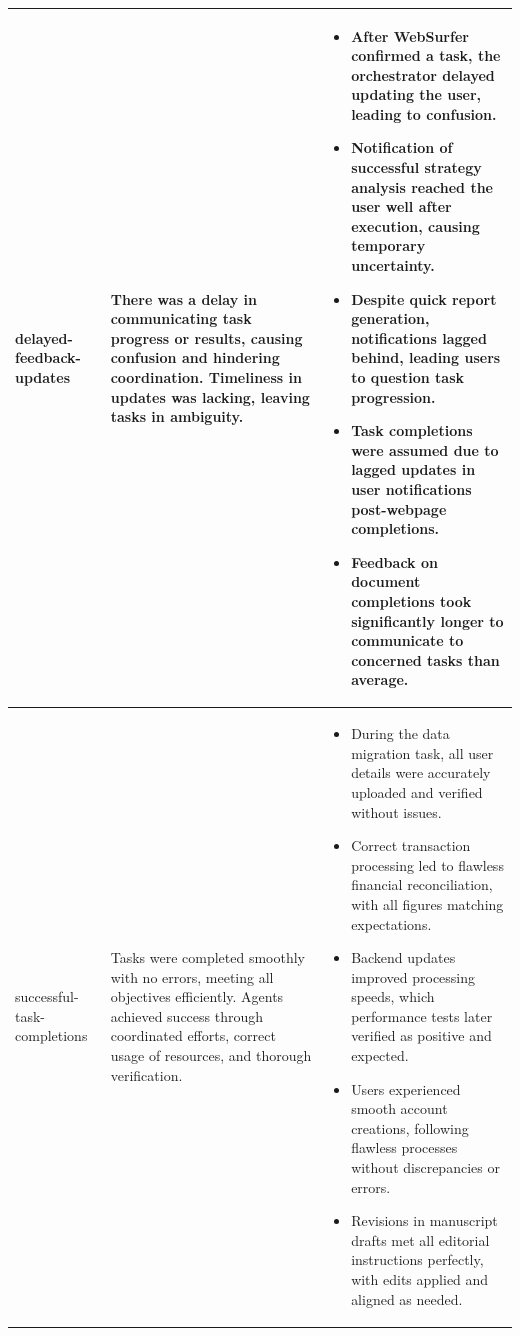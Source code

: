 \begin{longtable}{p{} p{} p{}}
delayed-feedback-updates &
There was a delay in communicating task progress or results, causing confusion and hindering coordination. Timeliness in updates was lacking, leaving tasks in ambiguity. &
\begin{itemize}
  \item After WebSurfer confirmed a task, the orchestrator delayed updating the user, leading to confusion.
  \item Notification of successful strategy analysis reached the user well after execution, causing temporary uncertainty.
  \item Despite quick report generation, notifications lagged behind, leading users to question task progression.
  \item Task completions were assumed due to lagged updates in user notifications post-webpage completions.
  \item Feedback on document completions took significantly longer to communicate to concerned tasks than average.
\end{itemize}
\\ \hline

successful-task-completions &
Tasks were completed smoothly with no errors, meeting all objectives efficiently. Agents achieved success through coordinated efforts, correct usage of resources, and thorough verification. &
\begin{itemize}
  \item During the data migration task, all user details were accurately uploaded and verified without issues.
  \item Correct transaction processing led to flawless financial reconciliation, with all figures matching expectations.
  \item Backend updates improved processing speeds, which performance tests later verified as positive and expected.
  \item Users experienced smooth account creations, following flawless processes without discrepancies or errors.
  \item Revisions in manuscript drafts met all editorial instructions perfectly, with edits applied and aligned as needed.
\end{itemize}
\\ \hline

\end{longtable}
